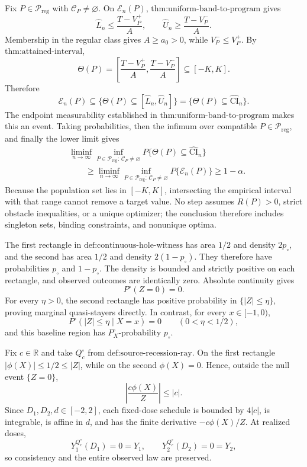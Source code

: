 Fix \(P\in\mathcal P_{\mathrm{reg}}\) with \(\mathcal C_P\neq\varnothing\).  On \(\mathcal E_n(P)\), \(\text{thm:uniform-band-to-program}\) gives
\[
 \widehat L_n\leq\frac{T-V_P^+}{A},
 \qquad
 \widehat U_n\geq\frac{T-V_P^-}{A}.
\]
Membership in the regular class gives \(A\geq a_0>0\), while \(V_P^-\leq V_P^+\).  By \(\text{thm:attained-interval}\),
\[
 \Theta(P)=
 \left[\frac{T-V_P^+}{A},\frac{T-V_P^-}{A}\right]
 \subseteq[-K,K].
\]
Therefore
\[
 \mathcal E_n(P)
 \subseteq
 \{\Theta(P)\subseteq[\widehat L_n,\widehat U_n]\}
 =\{\Theta(P)\subseteq\widehat{\mathrm{CI}}_n\}.
\]
The endpoint measurability established in \(\text{thm:uniform-band-to-program}\) makes this an event.  Taking probabilities, then the infimum over compatible \(P\in\mathcal P_{\mathrm{reg}}\), and finally the lower limit gives
\[
 \begin{aligned}
 &\liminf_{n\to\infty}
 \inf_{P\in\mathcal P_{\mathrm{reg}}:\,\mathcal C_P\neq\varnothing}
 P\{\Theta(P)\subseteq\widehat{\mathrm{CI}}_n\}\\
 &\qquad\geq
 \liminf_{n\to\infty}
 \inf_{P\in\mathcal P_{\mathrm{reg}}:\,\mathcal C_P\neq\varnothing}
 P\{\mathcal E_n(P)\}
 \geq1-\alpha.
 \end{aligned}
\]
Because the population set lies in \([-K,K]\), intersecting the empirical interval with that range cannot remove a target value.  No step assumes \(R(P)>0\), strict obstacle inequalities, or a unique optimizer; the conclusion therefore includes singleton sets, binding constraints, and nonunique optima.

The first rectangle in \(\text{def:continuous-hole-witness}\) has area \(1/2\) and density \(2p_{\circ}\), and the second has area \(1/2\) and density \(2(1-p_{\circ})\).  They therefore have probabilities \(p_{\circ}\) and \(1-p_{\circ}\).  The density is bounded and strictly positive on each rectangle, and observed outcomes are identically zero.  Absolute continuity gives
\[
 P^{\circ}(Z=0)=0.
\]
For every \(\eta>0\), the second rectangle has positive probability in \(\{|Z|\leq\eta\}\), proving marginal quasi-stayers directly.  In contrast, for every \(x\in[-1,0)\),
\[
 P^{\circ}(|Z|\leq\eta\mid X=x)=0
 \qquad(0<\eta<1/2),
\]
and this baseline region has \(P_X^{\circ}\)-probability \(p_{\circ}\).

Fix \(c\in\mathbb R\) and take \(Q_c^{\circ}\) from \(\text{def:source-recession-ray}\).  On the first rectangle \(|\phi(X)|\leq1/2\leq|Z|\), while on the second \(\phi(X)=0\).  Hence, outside the null event \(\{Z=0\}\),
\[
 \left|\frac{c\phi(X)}Z\right|\leq|c|.
\]
Since \(D_1,D_2,d\in[-2,2]\), each fixed-dose schedule is bounded by \(4|c|\), is integrable, is affine in \(d\), and has the finite derivative \(-c\phi(X)/Z\).  At realized doses,
\[
 Y_1^{Q_c^{\circ}}(D_1)=0=Y_1,
 \qquad
 Y_2^{Q_c^{\circ}}(D_2)=0=Y_2,
\]
so consistency and the entire observed law are preserved.

